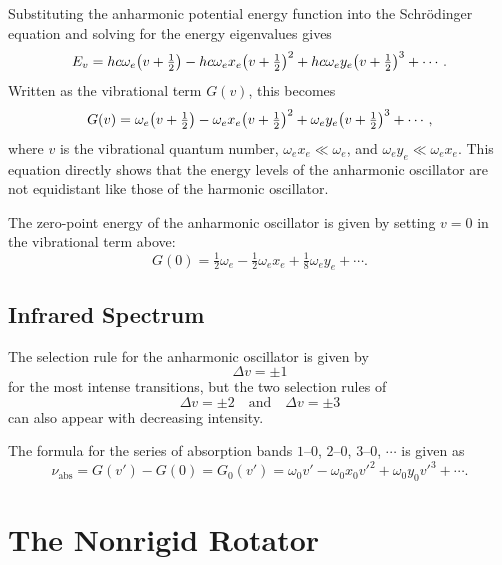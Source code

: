 \documentclass[11pt, twoside, fleqn]{report}
\DeclarePairedDelimiter\p{\lparen}{\rparen}
\newcommand{\up}{\text}
\newcommand{\dash}{\text{--}}
\begin{document}
Substituting the anharmonic potential energy function into the Schr\"odinger equation and solving for the energy eigenvalues gives
\begin{equation*}
    E_v = hc\omega_e\p*{v + \tfrac{1}{2}} - hc\omega_ex_e\p*{v + \tfrac{1}{2}}^2 + hc\omega_ey_e\p*{v + \tfrac{1}{2}}^3 + \dotsb.
\end{equation*}
Written as the vibrational term $G(v)$, this becomes
\begin{equation*}
    G(v) = \omega_e\p*{v + \tfrac{1}{2}} - \omega_ex_e\p*{v + \tfrac{1}{2}}^2 + \omega_ey_e\p*{v + \tfrac{1}{2}}^3 + \dotsb,
\end{equation*}
where $v$ is the vibrational quantum number, $\omega_ex_e \ll \omega_e$, and $\omega_ey_e \ll \omega_ex_e$. This equation directly shows that the energy levels of the anharmonic oscillator are not equidistant like those of the harmonic oscillator.

The zero-point energy of the anharmonic oscillator is given by setting $v = 0$ in the vibrational term above:
\begin{equation*}
    G(0) = \tfrac{1}{2}\omega_e - \tfrac{1}{2}\omega_ex_e + \tfrac{1}{8}\omega_ey_e + \dotsb.
\end{equation*}

\section{Infrared Spectrum}
\label{s:infrared_spectrum}

The selection rule for the anharmonic oscillator is given by
\begin{equation*}
    \Delta{}v = \pm 1
\end{equation*}
for the most intense transitions, but the two selection rules of
\begin{equation*}
    \Delta{}v = \pm 2 \quad\text{and}\quad \Delta{}v = \pm 3
\end{equation*}
can also appear with decreasing intensity.

The formula for the series of absorption bands $1\dash0$, $2\dash0$, $3\dash0$, $\dotsb$ is given as
\begin{equation*}
    \nu_\up{abs} = G(v') - G(0) = G_0(v') = \omega_0v' - \omega_0x_0v'^2 + \omega_0y_0v'^3 + \dotsb.
\end{equation*}

\chapter{The Nonrigid Rotator}
\label{c:the_nonrigid_rotator}
\end{document}

